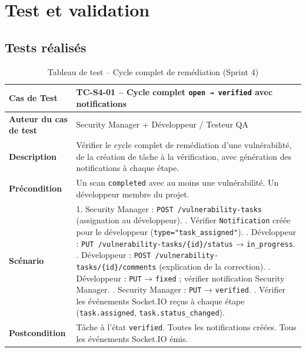 \section{Test et validation}

\subsection{Tests réalisés}

\begin{table}[H]
\centering
\caption{Tableau de test -- Cycle complet de remédiation (Sprint 4)}
\label{tab:test-sprint4}
\small
\renewcommand{\arraystretch}{1.3}
\begin{tabularx}{\textwidth}{>{\bfseries}p{3.5cm} X}
\hline
Cas de Test & TC-S4-01 -- Cycle complet \texttt{open → verified} avec notifications \\
\hline
Auteur du cas de test & Security Manager + Développeur / Testeur QA \\
\hline
Description & Vérifier le cycle complet de remédiation d'une vulnérabilité, de la création de tâche à la vérification, avec génération des notifications à chaque étape. \\
\hline
Précondition & Un scan \texttt{completed} avec au moins une vulnérabilité. Un développeur membre du projet. \\
\hline
Scénario &
1. Security Manager : \texttt{POST /vulnerability-tasks} (assignation au développeur). \newline
2. Vérifier \texttt{Notification} créée pour le développeur (\texttt{type="task\_assigned"}). \newline
3. Développeur : \texttt{PUT /vulnerability-tasks/\{id\}/status} → \texttt{in\_progress}. \newline
4. Développeur : \texttt{POST /vulnerability-tasks/\{id\}/comments} (explication de la correction). \newline
5. Développeur : \texttt{PUT} → \texttt{fixed} ; vérifier notification Security Manager. \newline
6. Security Manager : \texttt{PUT} → \texttt{verified}. \newline
7. Vérifier les événements Socket.IO reçus à chaque étape (\texttt{task.assigned}, \texttt{task.status\_changed}). \\
\hline
Postcondition & Tâche à l'état \texttt{verified}. Toutes les notifications créées. Tous les événements Socket.IO émis. \\
\hline
\end{tabularx}
\end{table}

